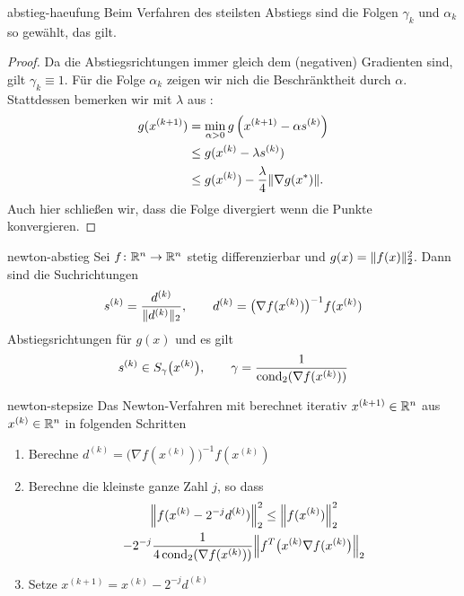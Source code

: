 \begin{Korollar}{abstieg-haeufung}
  Beim Verfahren des steilsten Abstiegs sind die Folgen $\gamma_k$ und
  $\alpha_k$ so gewählt, das  gilt.
\end{Korollar}

\begin{proof}
  Da die Abstiegsrichtungen immer gleich dem (negativen) Gradienten
  sind, gilt $\gamma_k \equiv 1$. Für die Folge $\alpha_k$ zeigen wir
  nich die Beschränktheit durch $\alpha$. Stattdessen bemerken wir mit
  $\lambda$ aus :
  \begin{align}
    g(x^{(k+1)})
    &= \min_{\alpha>0} g\left(x^{(k+1)}-\alpha s^{(k)}\right)\\
    &\le g(x^{(k)}-\lambda s^{(k)})\\
    &\le g(x^{(k)}) - \frac{\lambda}4 \lVert\nabla g(x^*)\rVert.
  \end{align}
  Auch hier schließen wir, dass die Folge divergiert wenn die Punkte konvergieren.
\end{proof}

\begin{Lemma}{newton-abstieg}
  Sei $f\colon \mathbb R^n\to \mathbb R^n$ stetig differenzierbar und
  $g(x) = \lVert f(x)\rVert_2^2$.  Dann sind die Suchrichtungen
  \begin{gather}
    s^{(k)} = \frac{d^{(k)}}{\lVert d^{(k)}\rVert_2},
    \qquad d^{(k)} = \bigl(\nabla f(x^{(k)})\bigr)^{-1}f(x^{(k)})
  \end{gather}
  Abstiegsrichtungen für $g(x)$ und es gilt
  \begin{gather}
    s^{(k)} \in S_\gamma\bigl(x^{(k)}\bigr),
    \qquad
    \gamma = \frac{1}{\operatorname{cond}_2(\nabla f(x^{(k)}))}
  \end{gather}
\end{Lemma}

\begin{Definition}{newton-stepsize}
  Das Newton-Verfahren mit  berechnet iterativ
  $x^{(k+1)}\in \mathbb R^n$ aus $x^{(k)}\in \mathbb R^n$ in folgenden Schritten
  \begin{enumerate}
  \item Berechne $d^{(k)} = \bigl(\nabla f(x^{(k)})\bigr)^{-1}f(x^{(k)})$
  \item Berechne die kleinste ganze Zahl $j$, so dass
    \begin{multline}
      \norm*{f(x^{(k)}-2^{-j} d^{(k)})}_2^2
      \le \norm*{f(x^{(k)})}_2^2
      \\- 2^{-j} \frac{1}{4\cond_2(\nabla f(x^{(k)}))}
      \norm*{f^T\bigl(x^{(k)}\nabla f(x^{(k)}\bigr)}_2
    \end{multline}
    \item Setze $x^{(k+1)}=x^{(k)}-2^{-j} d^{(k)}$
  \end{enumerate}
\end{Definition}

